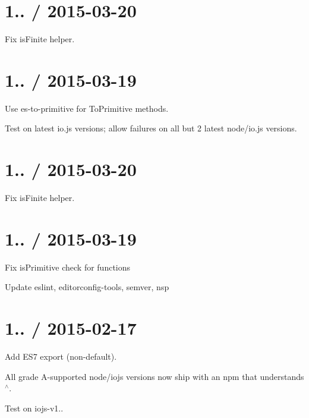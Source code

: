 \section*{1.. / 2015-\/03-\/20 }


\begin{DoxyItemize}
\item Fix {\ttfamily is\+Finite} helper.
\end{DoxyItemize}

\section*{1.. / 2015-\/03-\/19 }


\begin{DoxyItemize}
\item Use {\ttfamily es-\/to-\/primitive} for To\+Primitive methods.
\item Test on latest {\ttfamily io.\+js} versions; allow failures on all but 2 latest {\ttfamily node}/{\ttfamily io.\+js} versions.
\end{DoxyItemize}

\section*{1.. / 2015-\/03-\/20 }


\begin{DoxyItemize}
\item Fix is\+Finite helper.
\end{DoxyItemize}

\section*{1.. / 2015-\/03-\/19 }


\begin{DoxyItemize}
\item Fix is\+Primitive check for functions
\item Update {\ttfamily eslint}, {\ttfamily editorconfig-\/tools}, {\ttfamily semver}, {\ttfamily nsp}
\end{DoxyItemize}

\section*{1.. / 2015-\/02-\/17 }


\begin{DoxyItemize}
\item Add E\+S7 export (non-\/default).
\item All grade A-\/supported {\ttfamily node}/{\ttfamily iojs} versions now ship with an {\ttfamily npm} that understands {\ttfamily $^\wedge$}.
\item Test on {\ttfamily iojs-\/v1.}.
\end{DoxyItemize}

